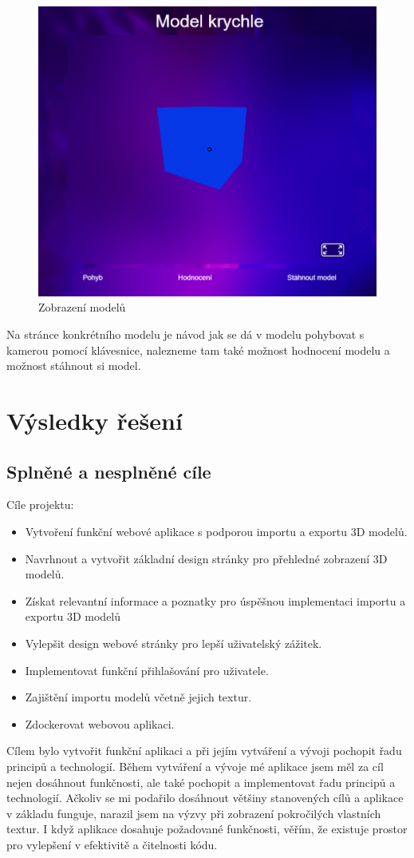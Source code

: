 \documentclass[12pt, a4paper,
oneside,      %
openright
]{report}
\begin{document}
\begin{figure}[h]
			\centering
			\includegraphics[width=0.5\linewidth]{image/model.png} 
			\caption{Zobrazení modelů}
		\end{figure}
		Na stránce konkrétního modelu je návod jak se dá v modelu pohybovat s kamerou pomocí klávesnice, nalezneme tam také možnost hodnocení modelu a možnost stáhnout si model.
\chapter{Výsledky řešení}
\section[Splněné a nesplněné cíle]{Splněné a nesplněné cíle}
Cíle projektu:
\begin{itemize}[label=\(\bullet\)]
  \item Vytvoření funkční webové aplikace s podporou importu a exportu 3D modelů.
  \item  Navrhnout a vytvořit základní design stránky pro přehledné zobrazení 3D modelů.
  \item Získat relevantní informace a poznatky pro úspěšnou implementaci importu a exportu 3D modelů
  \item  Vylepšit design webové stránky pro lepší uživatelský zážitek.
   \item   Implementovat funkční přihlašování pro uživatele.
    \item   Zajištění importu modelů včetně jejich textur.
    \item   Zdockerovat webovou aplikaci.
\end{itemize}
Cílem bylo vytvořit funkční aplikaci a při jejím vytváření a vývoji pochopit řadu principů a technologií. Během vytváření a vývoje mé aplikace jsem měl za cíl nejen dosáhnout funkčnosti, ale také pochopit a implementovat řadu principů a technologií. Ačkoliv se mi podařilo dosáhnout většiny stanovených cílů a aplikace v základu funguje, narazil jsem na výzvy při zobrazení pokročilých vlastních textur. I když aplikace dosahuje požadované funkčnosti, věřím, že existuje prostor pro vylepšení v efektivitě a čitelnosti kódu.
\end{document}
